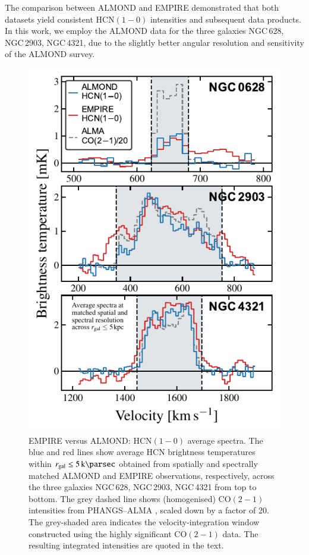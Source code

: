 \documentclass[letter, longauth]{aa} %
\newcommand*{\hcnone}{\ensuremath{\mathrm{HCN(1-0)}}\xspace} %
\newcommand*{\cotwo}{\ensuremath{\mathrm{CO(2-1)}}\xspace} %
\newcommand*{\rgal}{\ensuremath{r_{\rm gal}}\xspace} %
\begin{document}
\begin{appendix}
The comparison between ALMOND and EMPIRE demonstrated that both datasets yield consistent \hcnone intensities and subsequent data products.
In this work, we employ the ALMOND data for the three galaxies NGC\,628, NGC\,2903, NGC\,4321, due to the slightly better angular resolution and sensitivity of the ALMOND survey.

\begin{figure}
\centering
\includegraphics[width=\columnwidth]{Figures/ALMOND_vs_EMPIRE_spectra_compressed_v2.pdf}
\caption{EMPIRE versus ALMOND: \hcnone average spectra.
The blue and red lines show average HCN brightness temperatures within $\rgal\leq\SI{5}{\kilo\parsec}$ obtained from spatially and spectrally matched ALMOND and EMPIRE observations, respectively, across the three galaxies NGC\,628, NGC\,2903, NGC\,4321 from top to bottom.
The grey dashed line shows (homogenised) \cotwo intensities from PHANGS--ALMA \citep{Leroy2021b}, scaled down by a factor of 20.
The grey-shaded area indicates the velocity-integration window constructed using the highly significant \cotwo data.
The resulting integrated intensities are quoted in the text.
}
\label{fig:empire_vs_almond_spectra}
\end{figure}


\end{appendix}
\end{document}
